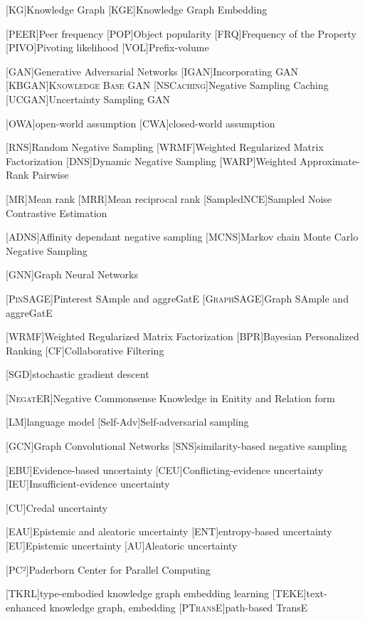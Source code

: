 \begin{acronym}[ECU]

[KG]{Knowledge Graph}
[KGE]{Knowledge Graph Embedding}

[\textsc{PEER}]{Peer frequency}
[\textsc{POP}]{Object popularity }
[\textsc{FRQ}]{Frequency of the Property}
[\textsc{PIVO}]{Pivoting likelihood}
[\textsc{VOL}]{Prefix-volume}

[GAN]{Generative Adversarial Networks}
[\textsc{IGAN}]{Incorporating GAN}
[\textsc{KBGAN}]{\textsc{Knowledge Base GAN}}
[\textsc{NSCaching}]{Negative Sampling Caching}
[\textsc{UCGAN}]{Uncertainty Sampling GAN}

[OWA]{open-world assumption}
[CWA]{closed-world assumption}

[RNS]{Random Negative Sampling}
[WRMF]{Weighted Regularized Matrix Factorization}
[DNS]{Dynamic Negative Sampling}
[WARP]{Weighted Approximate-Rank Pairwise}

[MR]{Mean rank}
[MRR]{Mean reciprocal rank}
[SampledNCE]{Sampled Noise Contrastive Estimation}

[\textsc{ADNS}]{Affinity dependant negative sampling}
[\textsc{MCNS}]{Markov chain Monte Carlo Negative Sampling}
    
[GNN]{Graph Neural Networks}

[\textsc{PinSAGE}]{Pinterest SAmple and aggreGatE}
[\textsc{GraphSAGE}]{Graph SAmple and aggreGatE}


[WRMF]{Weighted Regularized Matrix Factorization}
[BPR]{Bayesian Personalized Ranking}
[CF]{Collaborative Filtering}

[SGD]{stochastic gradient descent}

[\textsc{NegatER}]{Negative Commonsense Knowledge in Enitity and Relation form}

[LM]{language model}
[Self-Adv]{Self-adversarial sampling}

[GCN]{Graph Convolutional Networks}
[SNS]{similarity-based negative sampling}


[EBU]{Evidence-based uncertainty}
[CEU]{Conflicting-evidence uncertainty}
[IEU]{Insufficient-evidence uncertainty}

[CU]{Credal uncertainty}

[EAU]{Epistemic and aleatoric uncertainty}
[ENT]{entropy-based uncertainty}
[EU]{Epistemic uncertainty}
[AU]{Aleatoric uncertainty}
    
[PC²]{Paderborn Center for Parallel Computing}

[\textsc{TKRL}]{type-embodied knowledge graph embedding learning}
[\textsc{TEKE}]{text-enhanced knowledge graph, embedding}
[\textsc{PTransE}]{path-based TransE}

\end{acronym}